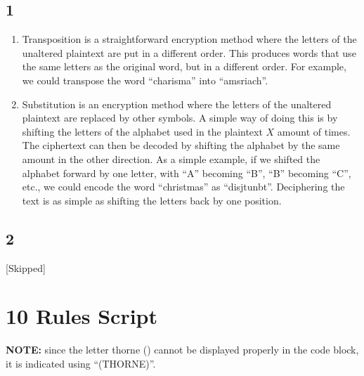 \documentclass{article}
\begin{document}
\subsection{1}
\begin{enumerate}
    \item Transposition is a straightforward encryption method where the letters of the unaltered plaintext are put in a different order. This produces words that use the same letters as the original word, but in a different order. For example, we could transpose the word ``charisma'' into ``amsriach''.
    \item Substitution is an encryption method where the letters of the unaltered plaintext are replaced by other symbols. A simple way of doing this is by shifting the letters of the alphabet used in the plaintext $X$ amount of times. The ciphertext can then be decoded by shifting the alphabet by the same amount in the other direction. As a simple example, if we shifted the alphabet forward by one letter, with ``A'' becoming ``B'', ``B'' becoming ``C'', etc., we could encode the word ``christmas'' as ``disjtunbt''. Deciphering the text is as simple as shifting the letters back by one position.
\end{enumerate}

\subsection{2}
[Skipped]



\newpage
\appendix
\section{10 Rules Script}
\textbf{NOTE:} since the letter thorne (\TH) cannot be displayed properly in the code block, it is indicated using ``(THORNE)''.
\end{document}
